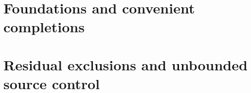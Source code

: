 \clearpage
\part{Foundations and convenient completions}

























\clearpage
\part{Residual exclusions and unbounded source control}





























